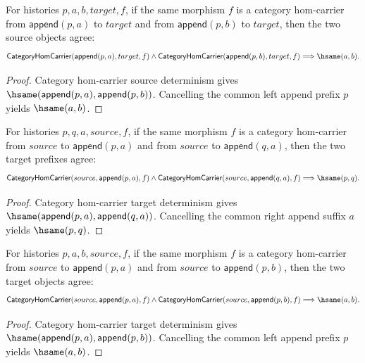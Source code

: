 \begin{theorem}
\label{thm:functor-prefix-hom-carrier-source-object-deterministic}
For histories $p,a,b,target,f$, if the same morphism $f$ is a category
hom-carrier from $\mathsf{append}(p,a)$ to $target$ and from
$\mathsf{append}(p,b)$ to $target$, then the two source objects agree:
$$
\mathsf{CategoryHomCarrier}(\mathsf{append}(p,a),target,f)
\land
\mathsf{CategoryHomCarrier}(\mathsf{append}(p,b),target,f)
\Longrightarrow
\hsame(a,b).
$$
\end{theorem}
\begin{proof}
Category hom-carrier source determinism gives
$\hsame(\mathsf{append}(p,a),\mathsf{append}(p,b))$. Cancelling the common
left append prefix $p$ yields $\hsame(a,b)$.
\end{proof}

\begin{theorem}
\label{thm:functor-prefix-hom-carrier-target-prefix-deterministic}
For histories $p,q,a,source,f$, if the same morphism $f$ is a category
hom-carrier from $source$ to $\mathsf{append}(p,a)$ and from $source$ to
$\mathsf{append}(q,a)$, then the two target prefixes agree:
$$
\mathsf{CategoryHomCarrier}(source,\mathsf{append}(p,a),f)
\land
\mathsf{CategoryHomCarrier}(source,\mathsf{append}(q,a),f)
\Longrightarrow
\hsame(p,q).
$$
\end{theorem}
\begin{proof}
Category hom-carrier target determinism gives
$\hsame(\mathsf{append}(p,a),\mathsf{append}(q,a))$. Cancelling the common
right append suffix $a$ yields $\hsame(p,q)$.
\end{proof}

\begin{theorem}
\label{thm:functor-prefix-hom-carrier-target-object-deterministic}
For histories $p,a,b,source,f$, if the same morphism $f$ is a category
hom-carrier from $source$ to $\mathsf{append}(p,a)$ and from $source$ to
$\mathsf{append}(p,b)$, then the two target objects agree:
$$
\mathsf{CategoryHomCarrier}(source,\mathsf{append}(p,a),f)
\land
\mathsf{CategoryHomCarrier}(source,\mathsf{append}(p,b),f)
\Longrightarrow
\hsame(a,b).
$$
\end{theorem}
\begin{proof}
Category hom-carrier target determinism gives
$\hsame(\mathsf{append}(p,a),\mathsf{append}(p,b))$. Cancelling the common
left append prefix $p$ yields $\hsame(a,b)$.
\end{proof}

